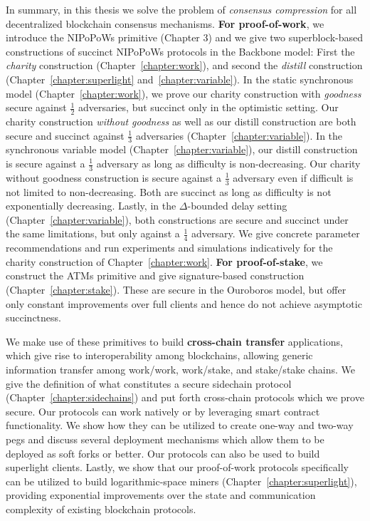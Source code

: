 In summary, in this thesis we solve the problem of \emph{consensus compression}
for all decentralized blockchain consensus mechanisms. \textbf{For
proof-of-work}, we introduce the NIPoPoWs primitive (Chapter 3) and we give two
superblock-based constructions of succinct NIPoPoWs protocols in the Backbone
model: First the \emph{charity} construction (Chapter~\ref{chapter:work}), and
second the \emph{distill} construction (Chapter~\ref{chapter:superlight}
and~\ref{chapter:variable}). In the static synchronous model
(Chapter~\ref{chapter:work}), we prove our charity construction with
\emph{goodness} secure against $\frac{1}{2}$ adversaries, but succinct only in
the optimistic setting. Our charity construction \emph{without goodness} as well
as our distill construction are both secure and succinct against $\frac{1}{3}$
adversaries (Chapter~\ref{chapter:variable}). In the synchronous variable model
(Chapter~\ref{chapter:variable}), our distill construction is secure against a
$\frac{1}{3}$ adversary as long as difficulty is non-decreasing. Our charity
without goodness construction is secure against a $\frac{1}{3}$ adversary even
if difficult is not limited to non-decreasing. Both are succinct as long as
difficulty is not exponentially decreasing. Lastly, in the $\Delta$-bounded
delay setting (Chapter~\ref{chapter:variable}), both constructions are secure
and succinct under the same limitations, but only against a $\frac{1}{4}$
adversary. We give concrete parameter recommendations and run experiments and
simulations indicatively for the charity construction of
Chapter~\ref{chapter:work}. \textbf{For proof-of-stake}, we construct the ATMs
primitive and give signature-based construction (Chapter~\ref{chapter:stake}).
These are secure in the Ouroboros model, but offer only constant improvements
over full clients and hence do not achieve asymptotic succinctness.

We make use of these primitives to build \textbf{cross-chain transfer}
applications, which give rise to interoperability among blockchains, allowing
generic information transfer among work/work, work/stake, and stake/stake
chains. We give the definition of what constitutes a secure sidechain protocol
(Chapter~\ref{chapter:sidechains}) and put forth cross-chain protocols which we
prove secure. Our protocols can work natively or by leveraging smart contract
functionality. We show how they can be utilized to create one-way and two-way
pegs and discuss several deployment mechanisms which allow them to be deployed
as soft forks or better. Our protocols can also be used to build superlight
clients. Lastly, we show that our proof-of-work protocols specifically can be
utilized to build logarithmic-space miners (Chapter~\ref{chapter:superlight}),
providing exponential improvements over the state and communication complexity
of existing blockchain protocols.

